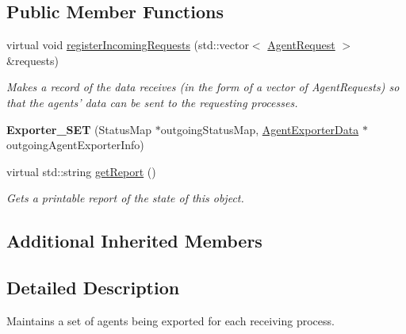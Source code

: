 \subsection*{Public Member Functions}
\begin{DoxyCompactItemize}
\item 
\hypertarget{classrepast_1_1_exporter___s_e_t_a06463c5911250be6ac77c1c3b5f2ef34}{virtual void \hyperlink{classrepast_1_1_exporter___s_e_t_a06463c5911250be6ac77c1c3b5f2ef34}{register\-Incoming\-Requests} (std\-::vector$<$ \hyperlink{classrepast_1_1_agent_request}{Agent\-Request} $>$ \&requests)}\label{classrepast_1_1_exporter___s_e_t_a06463c5911250be6ac77c1c3b5f2ef34}

\begin{DoxyCompactList}\small\item\em Makes a record of the data receives (in the form of a vector of Agent\-Requests) so that the agents' data can be sent to the requesting processes. \end{DoxyCompactList}\item 
\hypertarget{classrepast_1_1_exporter___s_e_t_afb4b63299bb8a761dfc55dd9e4fec3d8}{{\bfseries Exporter\-\_\-\-S\-E\-T} (Status\-Map $\ast$outgoing\-Status\-Map, \hyperlink{classrepast_1_1_agent_exporter_data}{Agent\-Exporter\-Data} $\ast$outgoing\-Agent\-Exporter\-Info)}\label{classrepast_1_1_exporter___s_e_t_afb4b63299bb8a761dfc55dd9e4fec3d8}

\item 
\hypertarget{classrepast_1_1_exporter___s_e_t_a84d24e786b0048d12b789bfdf14d276f}{virtual std\-::string \hyperlink{classrepast_1_1_exporter___s_e_t_a84d24e786b0048d12b789bfdf14d276f}{get\-Report} ()}\label{classrepast_1_1_exporter___s_e_t_a84d24e786b0048d12b789bfdf14d276f}

\begin{DoxyCompactList}\small\item\em Gets a printable report of the state of this object. \end{DoxyCompactList}\end{DoxyCompactItemize}
\subsection*{Additional Inherited Members}


\subsection{Detailed Description}
Maintains a set of agents being exported for each receiving process. 

